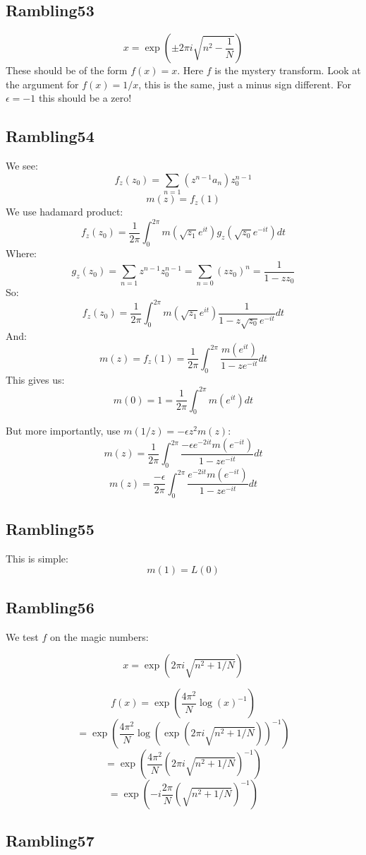 \documentclass[a4paper]{amsart}
\begin{document}
\subsection{Rambling53}
$$x = \exp(\pm 2\pi i\sqrt{n^2 - \frac{1}{N}})$$
These should be of the form $f(x) = x$. Here $f$ is the mystery transform. Look at the argument for $f(x) = 1/x$, this is the same, just a minus sign different. For $\epsilon = -1$ this should be a zero!


\subsection{Rambling54}

We see: 
$$f_z(z_0) = \sum_{n = 1} (z^{n-1}a_n) z_0^{n-1}$$
$$m(z) = f_z(1)$$
We use hadamard product:
$$f_z(z_0) = \frac{1}{2\pi}\int_0^{2\pi} m(\sqrt{z_1}e^{it}) g_z(\sqrt{z_0}e^{-it}) dt$$
Where:
$$g_z(z_0) = \sum_{n = 1} z^{n-1} z_0^{n - 1} = \sum_{n = 0} (zz_0)^n = \frac{1}{1 - zz_0}$$
So:
$$f_z(z_0) = \frac{1}{2\pi}\int_0^{2\pi} m(\sqrt{z_1}e^{it}) \frac{1}{1 - z\sqrt{z_0}e^{-it}} dt$$
And:
$$m(z) = f_z(1) = \frac{1}{2\pi}\int_0^{2\pi} \frac{m(e^{it})}{1 - ze^{-it}} dt$$
This gives us:
$$m(0) = 1 = \frac{1}{2\pi}\int_0^{2\pi} m(e^{it}) dt$$

But more importantly, use $m(1/z) = -\epsilon z^2m(z)$:
$$m(z) = \frac{1}{2\pi}\int_0^{2\pi} \frac{-\epsilon e^{-2it} m(e^{-it})}{1 - ze^{-it}} dt$$
$$m(z) = \frac{-\epsilon}{2\pi}\int_0^{2\pi} \frac{e^{-2it} m(e^{-it})}{1 - ze^{-it}} dt$$


\subsection{Rambling55}

This is simple:
$$m(1) = L(0)$$


\subsection{Rambling56}

We test $f$ on the magic numbers:

$$x = \exp(2\pi i \sqrt{n^2 + 1/N})$$

$$f(x) = \exp(\frac{4\pi^2}{N}\log(x)^{-1})$$
$$ = \exp(\frac{4\pi^2}{N}\log(\exp(2\pi i \sqrt{n^2 + 1/N}))^{-1})$$
$$ = \exp(\frac{4\pi^2}{N}(2\pi i \sqrt{n^2 + 1/N})^{-1})$$
$$ = \exp(-i\frac{2\pi}{N}(\sqrt{n^2 + 1/N})^{-1})$$




\subsection{Rambling57}
\end{document}
